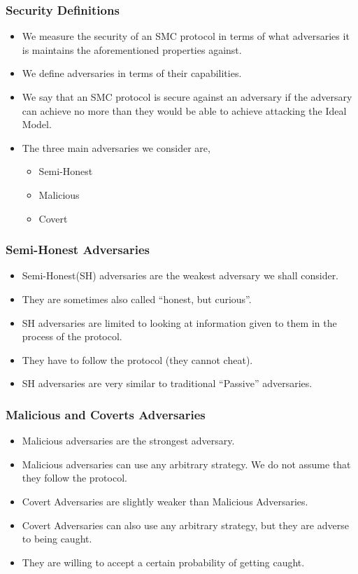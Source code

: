 \documentclass{beamer}
\begin{document}
	\begin{frame}
		\frametitle{Security Definitions}
		
		\begin{itemize}

		\item We measure the security of an SMC protocol in terms of what adversaries it is maintains the aforementioned properties against.
		
		\item We define adversaries in terms of their capabilities.

		\item We say that an SMC protocol is secure against an adversary if the adversary can achieve no more than they would be able to achieve attacking the Ideal Model.

		\item The three main adversaries we consider are,
			\begin{itemize}
				\item Semi-Honest 
				\item Malicious 
				\item Covert
			\end{itemize}
		\end{itemize}
	\end{frame}


	\begin{frame}
		\frametitle{Semi-Honest Adversaries}
		\begin{itemize}
			\item Semi-Honest(SH) adversaries are the weakest adversary we shall consider.
			\item They are sometimes also called ``honest, but curious''.
			\item SH adversaries are limited to looking at information given to them in the process of the protocol.
			\item They have to follow the protocol (they cannot cheat). 
			\item SH adversaries are very similar to traditional ``Passive'' adversaries.
		\end{itemize}
	\end{frame}


	\begin{frame}
		\frametitle{Malicious and Coverts Adversaries}
		\begin{itemize}
			\item Malicious adversaries are the strongest adversary.
			\item Malicious adversaries can use any arbitrary strategy. We do not assume that they follow the protocol.
			\bigskip
			\item Covert Adversaries are slightly weaker than Malicious Adversaries.
			\item Covert Adversaries can also use any arbitrary strategy, but they are adverse to being caught.
			\item They are willing to accept a certain probability of getting caught.
		\end{itemize}
	\end{frame}
\end{document}
